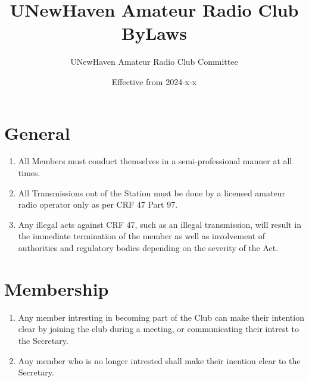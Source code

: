 \documentclass[a4paper,12pt]{article}
\title{UNewHaven Amateur Radio Club ByLaws}
\author{UNewHaven Amateur Radio Club Committee}
\date{Effective from 2024-x-x}
\begin{document}
\maketitle

\section{General}
\begin{enumerate}[label=\thesection.\arabic*.]
  \item All Members must conduct themselves in a semi-professional manner at all times.
  \item All Transmissions out of the Station must be done by a licensed amateur radio operator only as per CRF 47 Part 97.
  \item Any illegal acts against CRF 47, such as an illegal transmission, will result in the immediate termination of the member as well as involvement of authorities and regulatory bodies depending on the severity of the Act.
\end{enumerate}

\section{Membership}
\begin{enumerate}[label=\thesection.\arabic*.]
  \item Any member intresting in becoming part of the Club can make their intention clear by joining the club during a meeting, or communicating their intrest to the Secretary.
  \item Any member who is no longer intrested shall make their inention clear to the Secretary.
\end{enumerate}
\end{document}
